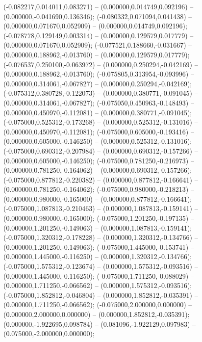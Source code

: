  (-0.082217,0.014011,0.083271) -- (0.000000,0.014749,0.092196) -- (0.000000,-0.041690,0.136346);
 (-0.080332,0.071094,0.041438) -- (0.000000,0.071670,0.052909) -- (0.000000,0.014749,0.092196);
 (-0.078778,0.129149,0.003314) -- (0.000000,0.129579,0.017779) -- (0.000000,0.071670,0.052909);
 (-0.077521,0.188660,-0.031667) -- (0.000000,0.188962,-0.013760) -- (0.000000,0.129579,0.017779);
 (-0.076537,0.250100,-0.063972) -- (0.000000,0.250294,-0.042169) -- (0.000000,0.188962,-0.013760);
 (-0.075805,0.313954,-0.093996) -- (0.000000,0.314061,-0.067827) -- (0.000000,0.250294,-0.042169);
 (-0.075312,0.380728,-0.122073) -- (0.000000,0.380771,-0.091045) -- (0.000000,0.314061,-0.067827);
 (-0.075050,0.450963,-0.148493) -- (0.000000,0.450970,-0.112081) -- (0.000000,0.380771,-0.091045);
 (-0.075000,0.525312,-0.173268) -- (0.000000,0.525312,-0.131016) -- (0.000000,0.450970,-0.112081);
 (-0.075000,0.605000,-0.193416) -- (0.000000,0.605000,-0.146250) -- (0.000000,0.525312,-0.131016);
 (-0.075000,0.690312,-0.207984) -- (0.000000,0.690312,-0.157266) -- (0.000000,0.605000,-0.146250);
 (-0.075000,0.781250,-0.216973) -- (0.000000,0.781250,-0.164062) -- (0.000000,0.690312,-0.157266);
 (-0.075000,0.877812,-0.220382) -- (0.000000,0.877812,-0.166641) -- (0.000000,0.781250,-0.164062);
 (-0.075000,0.980000,-0.218213) -- (0.000000,0.980000,-0.165000) -- (0.000000,0.877812,-0.166641);
 (-0.075000,1.087813,-0.210463) -- (0.000000,1.087813,-0.159141) -- (0.000000,0.980000,-0.165000);
 (-0.075000,1.201250,-0.197135) -- (0.000000,1.201250,-0.149063) -- (0.000000,1.087813,-0.159141);
 (-0.075000,1.320312,-0.178228) -- (0.000000,1.320312,-0.134766) -- (0.000000,1.201250,-0.149063);
 (-0.075000,1.445000,-0.153741) -- (0.000000,1.445000,-0.116250) -- (0.000000,1.320312,-0.134766);
 (-0.075000,1.575312,-0.123674) -- (0.000000,1.575312,-0.093516) -- (0.000000,1.445000,-0.116250);
 (-0.075000,1.711250,-0.088029) -- (0.000000,1.711250,-0.066562) -- (0.000000,1.575312,-0.093516);
 (-0.075000,1.852812,-0.046804) -- (0.000000,1.852812,-0.035391) -- (0.000000,1.711250,-0.066562);
 (-0.075000,2.000000,0.000000) -- (0.000000,2.000000,0.000000) -- (0.000000,1.852812,-0.035391);
 (0.000000,-1.922695,0.098784) -- (0.081096,-1.922129,0.097983) -- (0.075000,-2.000000,0.000000);
